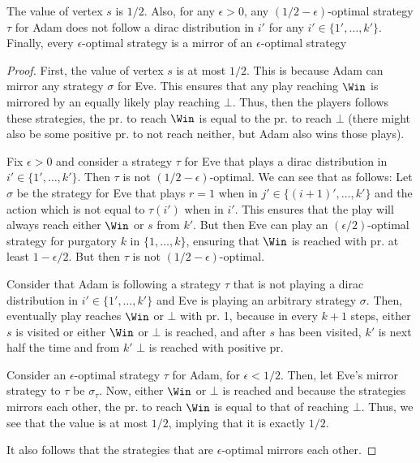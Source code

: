 \begin{lemma}
The value of vertex $s$ is $1/2$. Also, for any $\epsilon>0$, any $(1/2-\epsilon)$-optimal strategy $\tau$ for Adam does not follow a dirac distribution in $i'$ for any $i'\in\{1',\dots,k'\}$. Finally, every $\epsilon$-optimal strategy is a mirror of an $\epsilon$-optimal strategy
\end{lemma}
\begin{proof}
First, the value of vertex $s$ is at most $1/2$. This is because Adam can mirror any strategy $\sigma$ for Eve. This ensures that any play reaching $\Win$ is mirrored by an equally likely play reaching $\bot$. Thus, then the players follows these strategies, the pr. to reach $\Win$ is equal to the pr. to reach $\bot$ (there might also be some positive pr. to not reach neither, but Adam also wins those plays). 

Fix $\epsilon>0$ and consider a strategy $\tau$ for Eve that plays a dirac distribution in $i'\in\{1',\dots,k'\}$. Then $\tau$ is not $(1/2-\epsilon)$-optimal. We can see that as follows: Let $\sigma$ be the strategy for Eve that plays $r=1$ when in $j'\in \{(i+1)',\dots,k'\}$ and the action which is not equal to $\tau(i')$ when in $i'$. This ensures that the play will always reach either $\Win$ or $s$ from $k'$. But then  Eve can play an $(\epsilon/2)$-optimal strategy for purgatory $k$ in $\{1,\dots,k\}$, ensuring that $\Win$ is reached with pr. at least $1-\epsilon/2$. But then $\tau$ is not $(1/2-\epsilon)$-optimal.

Consider that Adam is following a strategy $\tau$ that is not playing a dirac distribution in $i'\in\{1',\dots,k'\}$ and Eve is playing an arbitrary strategy $\sigma$. Then, eventually play reaches $\Win$ or $\bot$ with pr. 1,  because in every $k+1$ steps, either $s$ is visited or either $\Win$ or $\bot$ is reached, and after $s$ has been visited, $k'$ is next half the time and from $k'$ $\bot$ is reached with positive pr.

Consider an $\epsilon$-optimal strategy $\tau$ for Adam, for $\epsilon<1/2$. 
Then, let Eve's mirror strategy to $\tau$ be $\sigma_{\tau}$. Now, either $\Win$ or $\bot$ is reached and because the strategies mirrors each other, the pr. to reach $\Win$ is equal to that of reaching $\bot$. Thus, we see that the value is at most $1/2$, implying that it is exactly $1/2$.

It also follows that the strategies that are $\epsilon$-optimal mirrors each other.
\end{proof}



